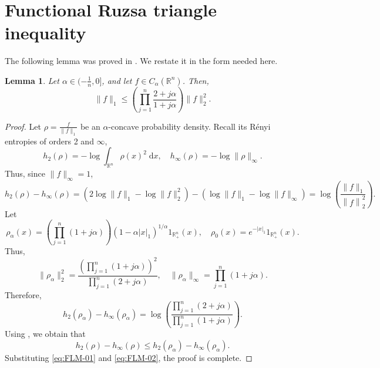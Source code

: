 \documentclass[11pt]{amsart}
\newcommand{\R}{{\mathbb R}}
\theoremstyle{plain}
\newtheorem{lemma}[theorem]{Lemma}
\theoremstyle{definition}
\theoremstyle{remark}
\begin{document}
\section{Functional Ruzsa triangle inequality}
\label{sec:triangle}


The following lemma was proved in \cite{FLM-20}. We restate it in the form needed here.
\begin{lemma} \label{FLM-20-formulate}
    Let $\alpha \in (-\frac{1}{n},0]$, and let $f \in C_\alpha (\R^n)$. Then,
    \[
        \|f\|_1 \leq \left(\prod_{j=1}^n \frac{2+j \alpha}{1+j \alpha} \right)\|f\|_2^2.
    \]
\end{lemma}
\begin{proof}
    Let $\rho = \frac{f}{\|f\|_1}$ be an $\alpha$-concave probability density. Recall its R\'enyi entropies of orders 2 and $\infty$,
$$
h_2(\rho)=-\log \int_{\mathbb{R}^n} \rho(x)^2 \; \mathrm d x,
\quad
h_{\infty}(\rho)=-\log \|\rho\|_{\infty} .
$$
Thus, since $\|f\|_\infty = 1$,
\begin{equation}\label{eq:FLM-01}
    h_2(\rho) -h_\infty(\rho)=\left(2 \log \|f\|_1 -\log \|f\|_2^2\right) -\left(\log \|f\|_1-\log \|f\|_{\infty} \right) = \log \left(\frac{\|f\|_1}{\left\|f\right\|_2^2}\right).
\end{equation}
Let
\[
\rho_\alpha (x)= \left(\prod_{j=1}^n(1+j \alpha)\right)\left(1-\alpha |x|_1\right)^{1 / \alpha} {1}_{\mathbb{R}_{+}^n}(x), \quad \rho_0 (x)= e^{-|x|_1} {1}_{\mathbb{R}_{+}^n}(x).
\]
Thus,
\[
    \|\rho_\alpha\|_2^2 = \frac{\left(\prod_{j=1}^n(1+j \alpha)\right)^2}{\prod_{j=1}^n(2+j \alpha)}, \quad \| \rho_\alpha \|_\infty = \prod_{j=1}^n(1+j \alpha).
\]
Therefore,
\begin{equation} \label{eq:FLM-02}
    h_2(\rho_\alpha) -h_\infty(\rho_\alpha) = \log \left(\frac{\prod_{j=1}^n(2+j \alpha)}{\prod_{j=1}^n(1+j \alpha)} \right).
\end{equation}
Using \cite[Corollary 7.1]{FLM-20}, we obtain that
    \[
        h_2(\rho) -h_\infty(\rho) \leq h_2(\rho_\alpha) -h_\infty(\rho_\alpha).
    \]
    Substituting \eqref{eq:FLM-01} and \eqref{eq:FLM-02}, the proof is complete.
\end{proof}
\end{document}
